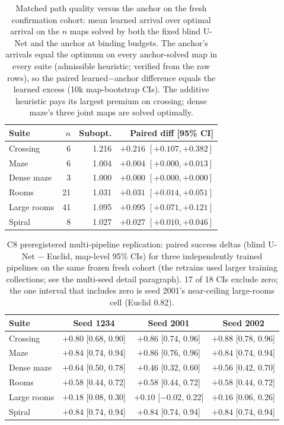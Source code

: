 \documentclass[letterpaper]{article} %
\newcommand{\stage}[1]{\textsc{#1}}
\begin{document}
\begin{table}[t]
\centering
\small
\begin{tabular}{@{}lrrr@{}}
\toprule
Suite & $n$ & Subopt. & Paired diff [95\% CI] \\
\midrule
Crossing & 6 & 1.216 & $+0.216$ $[+0.107,+0.382]$ \\
Maze & 6 & 1.004 & $+0.004$ $[+0.000,+0.013]$ \\
Dense maze & 3 & 1.000 & $+0.000$ $[+0.000,+0.000]$ \\
Rooms & 21 & 1.031 & $+0.031$ $[+0.014,+0.051]$ \\
Large rooms & 41 & 1.095 & $+0.095$ $[+0.071,+0.121]$ \\
Spiral & 8 & 1.027 & $+0.027$ $[+0.010,+0.046]$ \\
\bottomrule
\end{tabular}
\caption{Matched path quality versus the anchor on the fresh confirmation cohort: mean learned arrival over optimal arrival on the $n$ maps solved by both the fixed blind U-Net and the anchor at binding budgets. The anchor's arrivals equal the optimum on every anchor-solved map in every suite (admissible heuristic; verified from the raw rows), so the paired learned$-$anchor difference equals the learned excess (10k map-bootstrap CIs). The additive heuristic pays its largest premium on crossing; dense maze's three joint maps are solved optimally.}
\label{tab:pathq}
\end{table}

\begin{table}[t]
\centering
\small
\setlength{\tabcolsep}{2.6pt}
\begin{tabular}{@{}lccc@{}}
\toprule
Suite & Seed 1234 & Seed 2001 & Seed 2002 \\
\midrule
Crossing & $+0.80$ [0.68, 0.90] & $+0.86$ [0.74, 0.96] & $+0.88$ [0.78, 0.96] \\
Maze & $+0.84$ [0.74, 0.94] & $+0.86$ [0.76, 0.96] & $+0.84$ [0.74, 0.94] \\
Dense maze & $+0.64$ [0.50, 0.78] & $+0.46$ [0.32, 0.60] & $+0.56$ [0.42, 0.70] \\
Rooms & $+0.58$ [0.44, 0.72] & $+0.58$ [0.44, 0.72] & $+0.58$ [0.44, 0.72] \\
Large rooms & $+0.18$ [0.08, 0.30] & $+0.10$ [$-$0.02, 0.22] & $+0.16$ [0.06, 0.26] \\
Spiral & $+0.84$ [0.74, 0.94] & $+0.84$ [0.74, 0.94] & $+0.84$ [0.74, 0.94] \\
\bottomrule
\end{tabular}
\caption{\stage{C8} preregistered multi-pipeline replication: paired success deltas (blind U-Net $-$ Euclid, map-level 95\% CIs) for three independently trained pipelines on the same frozen fresh cohort (the retrains used larger training collections; see the multi-seed detail paragraph). 17 of 18 CIs exclude zero; the one interval that includes zero is seed 2001's near-ceiling large-rooms cell (Euclid 0.82).}
\label{tab:c8seeds}
\end{table}
\end{document}
